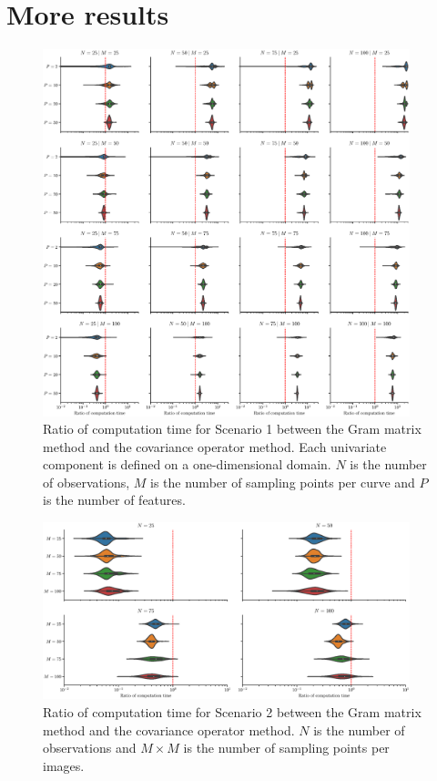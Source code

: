 \section{More results} %
\label{sec:more_results}

\begin{figure}
     \centering
    \includegraphics[width=0.95\textwidth]{figures/scenario_1/computation_time.eps}
    \caption{Ratio of computation time for Scenario 1 between the Gram matrix method and the covariance operator method. Each univariate component is defined on a one-dimensional domain. $N$ is the number of observations, $M$ is the number of sampling points per curve and $P$ is the number of features.}
    \label{fig:computation_time_mfd_1d}
\end{figure}

\begin{figure}
     \centering
    \includegraphics[width=0.95\textwidth]{figures/scenario_2/computation_time.eps}
    \caption{Ratio of computation time for Scenario 2 between the Gram matrix method and the covariance operator method. $N$ is the number of observations and $M \times M$ is the number of sampling points per images.}
    \label{fig:computation_time_mfd_2d}
\end{figure}


